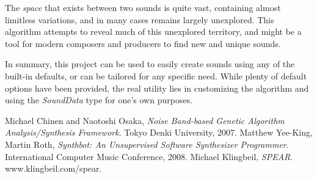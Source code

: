 \documentclass[11pt]{article}
\begin{document}
The \emph{space} that exists between two sounds is quite vast, containing almost limitless variations, and in many cases remains largely unexplored. This algorithm attempts to reveal much of this unexplored territory, and might be a tool for modern composers and producers to find new and unique sounds. 

In summary, this project can be used to easily create sounds using any of the built-in defaults, or can be tailored for any specific need. While plenty of default options have been provided, the real utility lies in customizing the algorithm and using the \emph{SoundData} type for one's own purposes. 

\begin{thebibliography}{2}

	  Michael Chinen and Naotoshi Osaka,
	  \emph{Noise Band-based Genetic Algorithm Analysis/Synthesis Framework}.
	  Tokyo Denki University,
	  2007.
	  Matthew Yee-King, Martin Roth,
	  \emph{Synthbot: An Unsupervised Software Synthesizer Programmer}.
	  International Computer Music Conference,
	  2008.
	  Michael Klingbeil,
	  \emph{SPEAR}.
	  www.klingbeil.com/spear.
\end{thebibliography}
\end{document}
